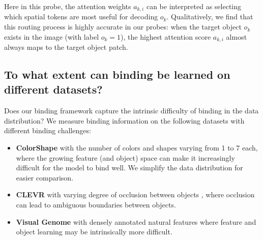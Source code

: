 \documentclass{article}
\theoremstyle{plain}
\theoremstyle{definition}
\theoremstyle{remark}
\begin{document}
\begin{table}[H]
\centering
\caption{\textbf{Probe-estimated binding information $\mathbf{B}_{\mathcal{O}}(Z)$, conditional binding information $\mathbf{B}^{*}_{\mathcal{O}, \mathcal{F}}(Z)$, proportion of dataset binding information resolved $\boldsymbol{\beta}_{\mathcal{O}}(Z)$, and their normalized forms $\boldsymbol{\beta}_{\mathcal{O}}(Z)$ and $\boldsymbol{\beta}^{*}_{\mathcal{O}, \mathcal{F}}(Z)$}, recorded on the test set. $H(O)=39.9$ bits and $H(F)=7.0$ bits on this test set. Attention probe's conditional results use the loss of the attention feature probe, while DNN's conditional results use the loss of the quadratic feature probe, as in Table \ref{tab:binding_information}.}
\label{binding_information_attn}
\end{table}

Here in this probe, the attention weights $a_{k, i}$ can be interpreted as selecting which spatial tokens are most useful for decoding $o_k$. Qualitatively, we find that this routing process is highly accurate in our probes: when the target object $o_k$ exists in the image (with label $o_k=1$), the highest attention score $a_{k, i}$ almost always maps to the target object patch. 


\subsection{To what extent can binding be learned on different datasets?}
\label{data}

Does our binding framework capture the intrinsic difficulty of binding in the data distribution? We measure binding information on the following datasets with different binding challenges: 
\begin{itemize}
    \item \textbf{ColorShape} with the number of colors and shapes varying from 1 to 7 each, where the growing feature (and object) space can make it increasingly difficult for the model to bind well. We simplify the data distribution for easier comparison.
    \item \textbf{CLEVR} with varying degree of occlusion between objects \cite{johnson2016clevrdiagnosticdatasetcompositional}, where occlusion can lead to ambiguous boundaries between objects.
    \item \textbf{Visual Genome} with densely annotated natural features \cite{krishna2017visual} where feature and object learning may be intrinsically more difficult.
\end{itemize}
\end{document}

